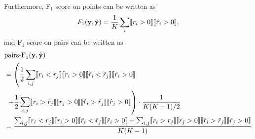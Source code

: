Furthermore, F$_1$ score on points can be written as
\begin{equation*}
F_1(\mathbf{y}, \hat{\mathbf{y}}) = \frac{1}{K} \sum_i \llbracket r_i > 0 \rrbracket  \llbracket \hat{r}_i > 0 \rrbracket,
\end{equation*}
and F$_1$ score on pairs can be written as
\begin{align*}
& \text{pairs-F}_1(\mathbf{y}, \hat{\mathbf{y}}) \\
&= \left( \frac{1}{2} \sum_{i,j} \llbracket r_i < r_j \rrbracket  \llbracket r_i > 0 \rrbracket \llbracket \hat{r}_i < \hat{r}_j \rrbracket  \llbracket \hat{r}_i > 0 \rrbracket \right. \\
&  \left. ~+ \frac{1}{2} \sum_{i,j} \llbracket r_i > r_j \rrbracket  \llbracket r_j > 0 \rrbracket \llbracket \hat{r}_i > \hat{r}_j \rrbracket  \llbracket \hat{r}_j > 0 \rrbracket \right)
   \cdot \frac{1}{K(K-1)/2} \\
&= \frac{\sum_{i,j} \llbracket r_i < r_j \rrbracket  \llbracket r_i > 0 \rrbracket \llbracket \hat{r}_i < \hat{r}_j \rrbracket  \llbracket \hat{r}_i > 0 \rrbracket +
         \sum_{i,j} \llbracket r_i > r_j \rrbracket  \llbracket r_j > 0 \rrbracket \llbracket \hat{r}_i > \hat{r}_j \rrbracket  \llbracket \hat{r}_j > 0 \rrbracket}
        {K(K-1)}
\end{align*}
